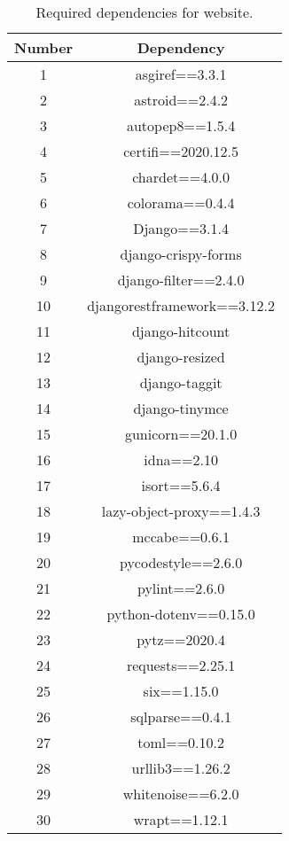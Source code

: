 \begin{table}[!h]
	\centering
	\begin{tabular}{ |c|c| }
		\hline
		Number & Dependency \\
		\hline
		1 & asgiref==3.3.1 \\
		2 & astroid==2.4.2 \\
		3 & autopep8==1.5.4 \\
		4 & certifi==2020.12.5 \\
		5 & chardet==4.0.0 \\
		6 & colorama==0.4.4 \\
		7 & Django==3.1.4 \\
		8 & django-crispy-forms \\
		9 & django-filter==2.4.0 \\
		10 & djangorestframework==3.12.2 \\
		11 & django-hitcount \\
		12 & django-resized \\
		13 & django-taggit \\
		14 & django-tinymce \\
		15 & gunicorn==20.1.0 \\
		16 & idna==2.10 \\
		17 & isort==5.6.4 \\
		18 & lazy-object-proxy==1.4.3 \\
		19 & mccabe==0.6.1 \\
		20 & pycodestyle==2.6.0 \\
		21 & pylint==2.6.0 \\
		22 & python-dotenv==0.15.0 \\
		23 & pytz==2020.4 \\
		24 & requests==2.25.1 \\
		25 & six==1.15.0 \\
		26 & sqlparse==0.4.1 \\
		27 & toml==0.10.2 \\
		28 & urllib3==1.26.2 \\
		29 & whitenoise==6.2.0 \\
		30 & wrapt==1.12.1 \\
		\hline
	\end{tabular}
	\caption{Required dependencies for website.}
	\label{table:4}
\end{table}


\goodbreak


\smallskip

\goodbreak

